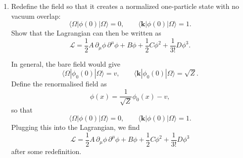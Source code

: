 \begin{enumerate}[label=\alph*)]
    \item Redefine the field so that it creates a normalized one-particle state
    with no vacuum overlap:
    \begin{equation}
        \langle\Omega|\phi(0)|\Omega\rangle=0,
        \qquad
        \langle\mathbf k|\phi(0)|\Omega\rangle=1.
    \end{equation}
    Show that the Lagrangian can then be written as
    \begin{equation}
        \mathcal L
        =\frac{1}{2}A\,\partial_\mu\phi\,\partial^\mu\phi
        +B\phi
        +\frac{1}{2}C\phi^2
        +\frac{1}{3!}D\phi^3.
    \end{equation}
    \begin{solution}
        In general, the bare field would give
        \begin{equation}
            \langle\Omega|\phi_0(0)|\Omega\rangle=v,
        \qquad
        \langle\mathbf k|\phi_0(0)|\Omega\rangle=\sqrt{Z}.
        \end{equation}
        Define the renormalised field as
        \begin{equation}
            \phi(x) = \frac{1}{\sqrt{Z}}\phi_0(x) -v,
        \end{equation}
        so that
        \begin{equation}
            \langle\Omega|\phi(0)|\Omega\rangle=0,
            \qquad
            \langle\mathbf k|\phi(0)|\Omega\rangle=1.
        \end{equation}
        Plugging this into the Lagrangian, we find
        \begin{equation}
                    \mathcal L
        =\frac{1}{2}A\,\partial_\mu\phi\,\partial^\mu\phi
        +B\phi
        +\frac{1}{2}C\phi^2
        +\frac{1}{3!}D\phi^3
        \end{equation}
        after some redefinition.
    \end{solution}


\end{enumerate}
